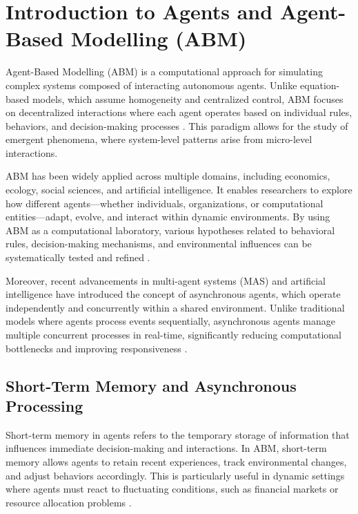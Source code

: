 \newpage



\section{Introduction to Agents and Agent-Based Modelling (ABM)}

Agent-Based Modelling (ABM) is a computational approach for simulating complex systems composed of interacting autonomous agents. Unlike equation-based models, which assume homogeneity and centralized control, ABM focuses on decentralized interactions where each agent operates based on individual rules, behaviors, and decision-making processes \cite{9}. This paradigm allows for the study of emergent phenomena, where system-level patterns arise from micro-level interactions.

ABM has been widely applied across multiple domains, including economics, ecology, social sciences, and artificial intelligence. It enables researchers to explore how different agents—whether individuals, organizations, or computational entities—adapt, evolve, and interact within dynamic environments. By using ABM as a computational laboratory, various hypotheses related to behavioral rules, decision-making mechanisms, and environmental influences can be systematically tested and refined \cite{9}.

Moreover, recent advancements in multi-agent systems (MAS) and artificial intelligence have introduced the concept of asynchronous agents, which operate independently and concurrently within a shared environment. Unlike traditional models where agents process events sequentially, asynchronous agents manage multiple concurrent processes in real-time, significantly reducing computational bottlenecks and improving responsiveness \cite{10}.

\subsection{Short-Term Memory and Asynchronous Processing}

Short-term memory in agents refers to the temporary storage of information that influences immediate decision-making and interactions. In ABM, short-term memory allows agents to retain recent experiences, track environmental changes, and adjust behaviors accordingly. This is particularly useful in dynamic settings where agents must react to fluctuating conditions, such as financial markets or resource allocation problems \cite{9}.


